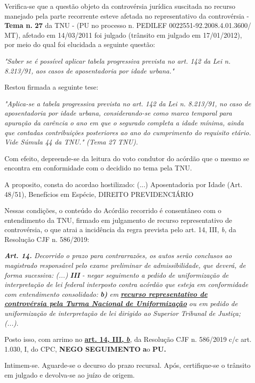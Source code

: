 \documentclass[12pt]{article}
\begin{document}
\justifying
\noindent Verifica-se que a questão objeto da controvérsia jurídica suscitada no recurso manejado pela parte recorrente esteve afetada no representativo da controvérsia - \textbf{Tema n. }\textbf{27} da TNU - (PU no processo n. PEDILEF 0022551-92.2008.4.01.3600/ MT),  afetado em 14/03/2011 foi julgado (trânsito em julgado em 17/01/2012), por meio do qual foi elucidada a seguinte questão:

\noindent \textit{"Saber se é possível aplicar tabela progressiva prevista no art. 142 da Lei n. 8.213/91, aos casos de aposentadoria por idade urbana."}

\noindent Restou firmada a seguinte tese:

\noindent \textit{"Aplica-se a tabela progressiva prevista no art. 142 da Lei n. 8.213/91, no caso de aposentadoria por idade urbana, considerando-se como marco temporal para apuração da carência o ano em que o segurado completa a idade mínima, ainda que contadas contribuições posteriores ao ano do cumprimento do requisito etário. Vide Súmula 44 da TNU." (Tema 27 TNU).}

\noindent Com efeito, depreende-se da leitura do voto condutor do acórdão que o mesmo se encontra em conformidade com o decidido no  tema pela TNU.

\noindent A proposito, consta do acordao hostilizado: (...) Aposentadoria por Idade (Art. 48/51), Benefícios em Espécie, DIREITO PREVIDENCIÁRIO

\noindent Nessas condições, o conteúdo do Acórdão recorrido é consentâneo com o entendimento da TNU, firmado em julgamento de recurso representativo de controvérsia, o que atrai a incidência da regra prevista pelo art. 14, III, \textit{b,} da Resolução CJF n. 586/2019:

\noindent \textit{\textbf{Art. 14.}}\textit{ Decorrido o prazo para contrarrazões, os autos serão conclusos ao magistrado responsável pelo exame preliminar de admissibilidade, que deverá, de forma sucessiva: (...) }\textit{\textbf{III }}\textit{- negar seguimento a pedido de uniformização de interpretação de lei federal interposto contra acórdão que esteja em conformidade com entendimento consolidado: }\textit{\textbf{b)}}\textit{ em }\uline{\textit{\textbf{recurso representativo de controvérsia pela Turma Nacional de Uniformização}}}\textit{ ou em pedido de uniformização de interpretação de lei dirigido ao Superior Tribunal de Justiça;(...).}

\noindent Posto isso, com arrimo no \uline{\textbf{art. 14, III, }}\uline{\textit{\textbf{b}}}\textit{,} da Resolução CJF n. 586/2019 c/c art. 1.030, I, do CPC, \textbf{NEGO SEGUIMENTO }\textbf{a}o\textbf{ PU}\textbf{.}

\noindent Intimem-se. Aguarde-se o decurso do prazo recursal. Após, certifique-se o trânsito em julgado e devolva-se ao juízo de origem.
\end{document}
